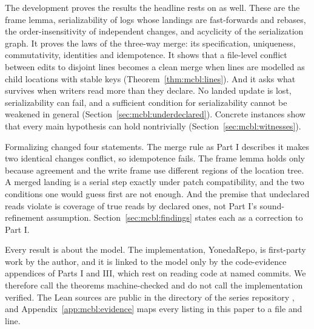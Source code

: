 \documentclass[11pt,letterpaper]{article}
\theoremstyle{definition}
\theoremstyle{remark}
\begin{document}
The development proves the results the headline rests on as well. These are the frame lemma, serializability of logs whose landings are fast-forwards and rebases, the order-insensitivity of independent changes, and acyclicity of the serialization graph. It proves the laws of the three-way merge: its specification, uniqueness, commutativity, identities and idempotence. It shows that a file-level conflict between edits to disjoint lines becomes a clean merge when lines are modelled as child locations with stable keys (Theorem~\ref{thm:mcbl:lines}). And it asks what survives when writers read more than they declare. No landed update is lost, serializability can fail, and a sufficient condition for serializability cannot be weakened in general (Section~\ref{sec:mcbl:underdeclared}). Concrete instances show that every main hypothesis can hold nontrivially (Section~\ref{sec:mcbl:witnesses}).

Formalizing changed four statements. The merge rule as Part I describes it makes two identical changes conflict, so idempotence fails. The frame lemma holds only because agreement and the write frame use different regions of the location tree. A merged landing is a serial step exactly under patch compatibility, and the two conditions one would guess first are not enough. And the premise that undeclared reads violate is coverage of true reads by declared ones, not Part I's sound-refinement assumption. Section~\ref{sec:mcbl:findings} states each as a correction to Part I.

Every result is about the model. The implementation, YonedaRepo, is first-party work by the author, and it is linked to the model only by the code-evidence appendices of Parts I and III, which rest on reading code at named commits. We therefore call the theorems machine-checked and do not call the implementation verified. The Lean sources are public in the directory  of the series repository \cite{yonedatx}, and Appendix~\ref{app:mcbl:evidence} maps every listing in this paper to a file and line.
\end{document}
